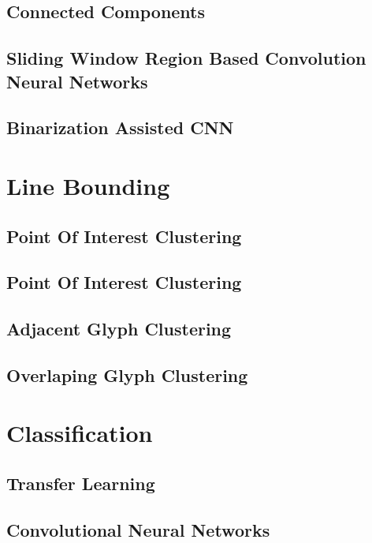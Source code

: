 \subsection{Connected Components}

\subsection{Sliding Window Region Based Convolution Neural Networks}

\subsection{Binarization Assisted CNN}

\section{Line Bounding}

\subsection{Point Of Interest Clustering}

\subsection{Point Of Interest Clustering}

\subsection{Adjacent Glyph Clustering}

\subsection{Overlaping Glyph Clustering}


\section{Classification}

\subsection{Transfer Learning}

\subsection{Convolutional Neural Networks}

